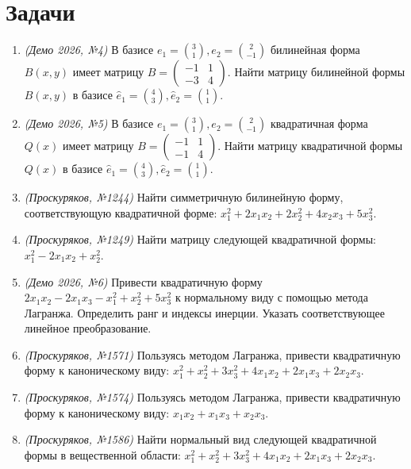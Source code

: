 \section*{Задачи}

\begin{enumerate}
    \item \textit{(Демо 2026, №4)} В базисе $e_1 = \binom{3}{1}, e_2 = \binom{2}{-1}$ билинейная форма $B(x,y)$ имеет матрицу 
    $B = \begin{pmatrix} -1 & 1 \\ -3 & 4 \end{pmatrix}$. 
    Найти матрицу билинейной формы $B(x,y)$ в базисе $\hat{e}_1 = \binom{4}{3}, \hat{e}_2 = \binom{1}{1}$.

    \item \textit{(Демо 2026, №5)} В базисе $e_1 = \binom{3}{1}, e_2 = \binom{2}{-1}$ квадратичная форма $Q(x)$ имеет матрицу 
    $B = \begin{pmatrix} -1 & 1 \\ -1 & 4 \end{pmatrix}$. 
    Найти матрицу квадратичной формы $Q(x)$ в базисе $\hat{e}_1 = \binom{4}{3}, \hat{e}_2 = \binom{1}{1}$.

    \item \textit{(Проскуряков, №1244)} Найти симметричную билинейную форму, соответствующую квадратичной форме: 
    $x_1^2 + 2x_1 x_2 + 2x_2^2 + 4x_2 x_3 + 5x_3^2$.

    \item \textit{(Проскуряков, №1249)} Найти матрицу следующей квадратичной формы: 
    $x_1^2 - 2x_1 x_2 + x_2^2$.

    \item \textit{(Демо 2026, №6)} Привести квадратичную форму 
    $2x_1 x_2 - 2x_1 x_3 - x_1^2 + x_2^2 + 5x_3^2$ 
    к нормальному виду с помощью метода Лагранжа. Определить ранг и индексы инерции. Указать соответствующее линейное преобразование.

    \item \textit{(Проскуряков, №1571)} Пользуясь методом Лагранжа, привести квадратичную форму к каноническому виду: 
    $x_1^2 + x_2^2 + 3x_3^2 + 4x_1 x_2 + 2x_1 x_3 + 2x_2 x_3$.

    \item \textit{(Проскуряков, №1574)} Пользуясь методом Лагранжа, привести квадратичную форму к каноническому виду: 
    $x_1 x_2 + x_1 x_3 + x_2 x_3$.

    \item \textit{(Проскуряков, №1586)} Найти нормальный вид следующей квадратичной формы в вещественной области: 
    $x_1^2 + x_2^2 + 3x_3^2 + 4x_1 x_2 + 2x_1 x_3 + 2x_2 x_3$.


\end{enumerate}
